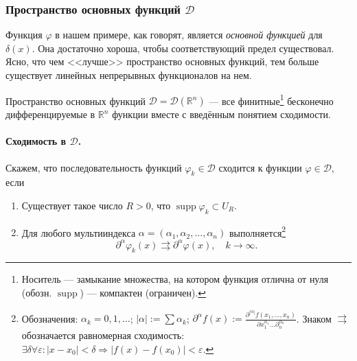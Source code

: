\subsubsection{Пространство основных функций $ \mathcal D $} Функция $ \varphi $ в
нашем примере, как говорят, является \emph{основной функцией} для $ \delta(x) $.
Она достаточно хороша, чтобы соответствующий предел существовал. Ясно, что чем
<<лучше>> пространство основных функций, тем больше существует линейных непрерывных
функционалов на нем. 

Пространство основных функций $ \mathcal D = \mathcal D(\mathbb R^n) $ ---
все финитные\footnote{Носитель --- замыкание множества, на котором функция
отлична от нуля (обозн. $ \operatorname{supp} $) --- компактен (ограничен).} бесконечно дифференцируемые в $
\mathbb R^n $ функции вместе с введённым понятием сходимости.

\paragraph{Сходимость в $ \mathcal D $.} Скажем, что последовательность функций $ \varphi_k \in
\mathcal D$ сходится к функции $ \varphi \in \mathcal D $, если 
\begin{enumerate}
  \item Существует такое число $ R > 0 $, что $ \operatorname{supp} \varphi_k \subset U_R $.
  \item Для любого мультииндекса $ \alpha = (\alpha_1, \alpha_2, \ldots,
    \alpha_n) $ выполняется\footnote{Обозначения: $\alpha_k = 0, 1, \ldots$;
    $|\alpha| := \sum \alpha_k$; $\partial^\alpha f(x) :=
  \frac{\partial^{|\alpha|}f(x_1, \ldots, x_n)}{\partial x_1^{\alpha_1}
\ldots\partial_n^{\alpha_n}}$. Знаком $ \rightrightarrows $ обозначается
равномерная сходимость: $ \exists \delta \forall\varepsilon\colon |x-x_0| < \delta
\Rightarrow |f(x) - f(x_0)| < \varepsilon $.} 
  \[
      \partial^\alpha \varphi_k(x) \rightrightarrows \partial^\alpha\varphi(x),
      \quad k \to \infty.
  \]
\end{enumerate}

